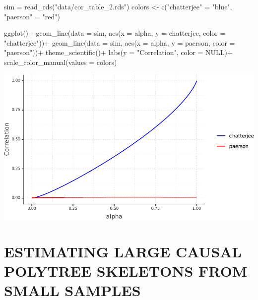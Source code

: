\documentclass[
  10pt,
]{article}
\newenvironment{Shaded}{\begin{snugshade}}{\end{snugshade}}
\newcommand{\AttributeTok}[1]{\textcolor[rgb]{0.77,0.63,0.00}{#1}}
\newcommand{\ConstantTok}[1]{\textcolor[rgb]{0.00,0.00,0.00}{#1}}
\newcommand{\FunctionTok}[1]{\textcolor[rgb]{0.00,0.00,0.00}{#1}}
\newcommand{\NormalTok}[1]{#1}
\newcommand{\OtherTok}[1]{\textcolor[rgb]{0.56,0.35,0.01}{#1}}
\newcommand{\SpecialCharTok}[1]{\textcolor[rgb]{0.00,0.00,0.00}{#1}}
\newcommand{\StringTok}[1]{\textcolor[rgb]{0.31,0.60,0.02}{#1}}
\begin{document}
\begin{Shaded}
\begin{Highlighting}[]
\NormalTok{sim }\OtherTok{=} \FunctionTok{read\_rds}\NormalTok{(}\StringTok{"data/cor\_table\_2.rds"}\NormalTok{)}
\NormalTok{colors }\OtherTok{\textless{}{-}} \FunctionTok{c}\NormalTok{(}\StringTok{"chatterjee"} \OtherTok{=} \StringTok{"blue"}\NormalTok{, }\StringTok{"paerson"} \OtherTok{=} \StringTok{"red"}\NormalTok{)}

\FunctionTok{ggplot}\NormalTok{()}\SpecialCharTok{+}
  \FunctionTok{geom\_line}\NormalTok{(}\AttributeTok{data =}\NormalTok{ sim, }\FunctionTok{aes}\NormalTok{(}\AttributeTok{x =}\NormalTok{ alpha, }\AttributeTok{y =}\NormalTok{ chatterjee, }\AttributeTok{color =} \StringTok{"chatterjee"}\NormalTok{))}\SpecialCharTok{+}
  \FunctionTok{geom\_line}\NormalTok{(}\AttributeTok{data =}\NormalTok{ sim, }\FunctionTok{aes}\NormalTok{(}\AttributeTok{x =}\NormalTok{ alpha, }\AttributeTok{y =}\NormalTok{ paerson, }\AttributeTok{color =} \StringTok{"paerson"}\NormalTok{))}\SpecialCharTok{+}
  \FunctionTok{theme\_scientific}\NormalTok{()}\SpecialCharTok{+}
  \FunctionTok{labs}\NormalTok{(}\AttributeTok{y =} \StringTok{"Correlation"}\NormalTok{, }\AttributeTok{color =} \ConstantTok{NULL}\NormalTok{)}\SpecialCharTok{+}
  \FunctionTok{scale\_color\_manual}\NormalTok{(}\AttributeTok{values =}\NormalTok{ colors)}
\end{Highlighting}
\end{Shaded}

\begin{center}\includegraphics[width=1\linewidth]{figure/unnamed-chunk-7-1} \end{center}

\hypertarget{estimating-large-causal-polytree-skeletons-from-small-samples}{%
\section{ESTIMATING LARGE CAUSAL POLYTREE SKELETONS FROM SMALL
SAMPLES}\label{estimating-large-causal-polytree-skeletons-from-small-samples}}
\end{document}
